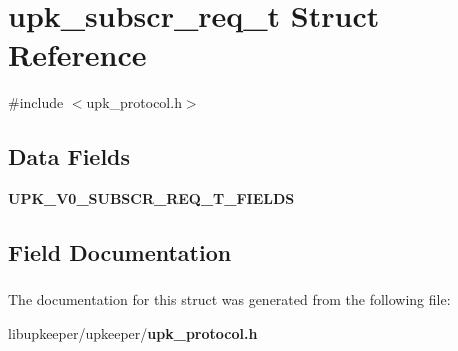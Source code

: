\section{upk\_\-subscr\_\-req\_\-t Struct Reference}
\label{structupk__subscr__req__t}


{\ttfamily \#include $<$upk\_\-protocol.h$>$}

\subsection*{Data Fields}
\begin{DoxyCompactItemize}
\item 
{\bf UPK\_\-V0\_\-SUBSCR\_\-REQ\_\-T\_\-FIELDS}
\end{DoxyCompactItemize}


\subsection{Field Documentation}
\subsubsection[{UPK\_\-V0\_\-SUBSCR\_\-REQ\_\-T\_\-FIELDS}]{}\label{structupk__subscr__req__t_a5c34fc128c85e9b5e75fc8629671f20d}


The documentation for this struct was generated from the following file:\begin{DoxyCompactItemize}
\item 
libupkeeper/upkeeper/{\bf upk\_\-protocol.h}\end{DoxyCompactItemize}
